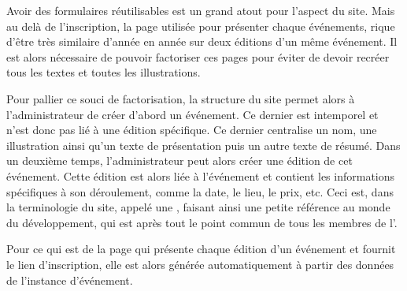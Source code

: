 Avoir des formulaires réutilisables est un grand atout pour l'aspect  du site. Mais au delà de l'inscription, la page utilisée pour présenter chaque événements, rique d'être très similaire d'année en année sur deux éditions d'un même événement. Il est alors nécessaire de pouvoir factoriser ces pages pour éviter de devoir recréer tous les textes et toutes les illustrations.
\bigskip

Pour pallier ce souci de factorisation, la structure du site permet alors à l'administrateur de créer d'abord un événement. Ce dernier est intemporel et n'est donc pas lié à une édition spécifique. Ce dernier centralise un nom, une illustration ainsi qu'un texte de présentation puis un autre texte de résumé. Dans un deuxième temps, l'administrateur peut alors créer une édition de cet événement. Cette édition est alors liée à l'événement et contient les informations spécifiques à son déroulement, comme la date, le lieu, le prix, etc. Ceci est, dans la terminologie du site, appelé une , faisant ainsi une petite référence au monde du développement, qui est après tout le point commun de tous les membres de l'\ofni.

Pour ce qui est de la page qui présente chaque édition d'un événement et fournit le lien d'inscription, elle est alors générée automatiquement à partir des données de l'instance d'événement.

